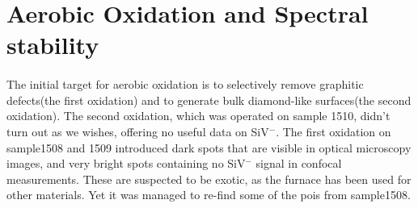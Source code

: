 \section{Aerobic Oxidation and Spectral stability}

\paragraph{}The initial target for aerobic oxidation is to selectively remove graphitic defects(the first oxidation) and to generate bulk diamond-like surfaces(the second oxidation). The second oxidation, which was operated on sample 1510, didn't turn out as we wishes, offering no useful data on SiV$^{-}$. The first oxidation on sample1508 and 1509 introduced dark spots that are visible in optical microscopy images, and very bright spots containing no SiV$^{-}$ signal in confocal measurements. These are suspected to be exotic, as the furnace has been used for other materials. Yet it was managed to re-find some of the pois from sample1508.

